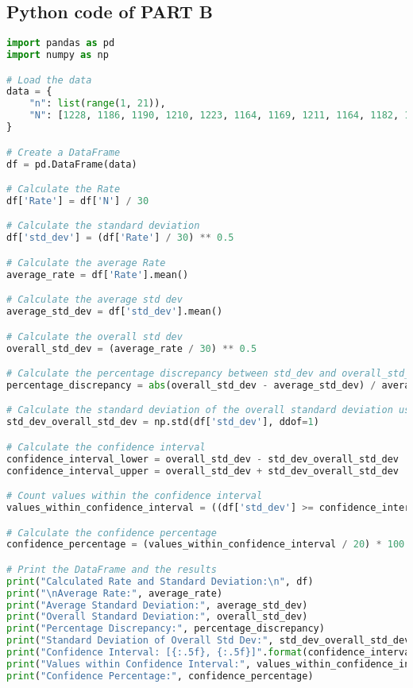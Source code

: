 \documentclass[a4paper,11pt]{article}
\begin{document}
\subsection*{Python code of PART B}
\begin{lstlisting}[language=Python]
import pandas as pd
import numpy as np

# Load the data
data = {
    "n": list(range(1, 21)),
    "N": [1228, 1186, 1190, 1210, 1223, 1164, 1169, 1211, 1164, 1182, 1184, 1146, 1134, 1168, 1137, 1189, 1158, 1151, 1124, 1132]
}

# Create a DataFrame
df = pd.DataFrame(data)

# Calculate the Rate
df['Rate'] = df['N'] / 30

# Calculate the standard deviation
df['std_dev'] = (df['Rate'] / 30) ** 0.5

# Calculate the average Rate
average_rate = df['Rate'].mean()

# Calculate the average std dev
average_std_dev = df['std_dev'].mean()

# Calculate the overall std dev
overall_std_dev = (average_rate / 30) ** 0.5

# Calculate the percentage discrepancy between std_dev and overall_std_dev
percentage_discrepancy = abs(overall_std_dev - average_std_dev) / average_std_dev * 100

# Calculate the standard deviation of the overall standard deviation using statistical methods
std_dev_overall_std_dev = np.std(df['std_dev'], ddof=1)

# Calculate the confidence interval
confidence_interval_lower = overall_std_dev - std_dev_overall_std_dev
confidence_interval_upper = overall_std_dev + std_dev_overall_std_dev

# Count values within the confidence interval
values_within_confidence_interval = ((df['std_dev'] >= confidence_interval_lower) & (df['std_dev'] <= confidence_interval_upper)).sum()

# Calculate the confidence percentage
confidence_percentage = (values_within_confidence_interval / 20) * 100

# Print the DataFrame and the results
print("Calculated Rate and Standard Deviation:\n", df)
print("\nAverage Rate:", average_rate)
print("Average Standard Deviation:", average_std_dev)
print("Overall Standard Deviation:", overall_std_dev)
print("Percentage Discrepancy:", percentage_discrepancy)
print("Standard Deviation of Overall Std Dev:", std_dev_overall_std_dev)
print("Confidence Interval: [{:.5f}, {:.5f}]".format(confidence_interval_lower, confidence_interval_upper))
print("Values within Confidence Interval:", values_within_confidence_interval)
print("Confidence Percentage:", confidence_percentage)
\end{lstlisting}
\end{document}
